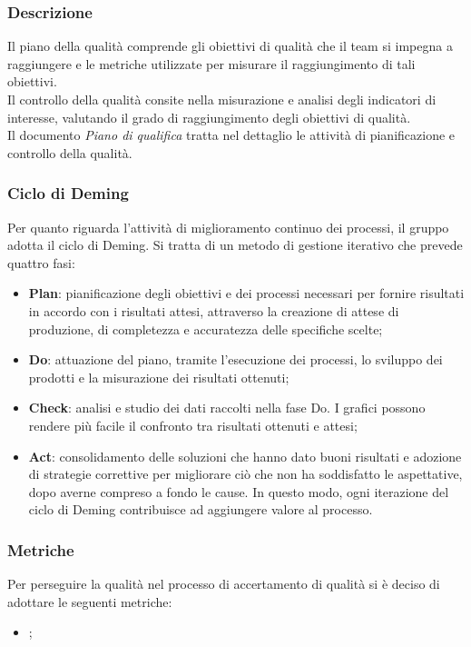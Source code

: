 \subsubsection{Descrizione}
Il piano della qualità comprende gli obiettivi di qualità che il team si
impegna a raggiungere e le metriche utilizzate per misurare il raggiungimento
di tali obiettivi. \\ Il controllo della qualità consite nella misurazione e
analisi degli indicatori di interesse, valutando il grado di raggiungimento
degli obiettivi di qualità. \\ Il documento \textit{Piano di qualifica} tratta
nel dettaglio le attività di pianificazione e controllo della qualità. \\
\subsubsection{Ciclo di Deming}
Per quanto riguarda l'attività di miglioramento continuo dei processi, il
gruppo adotta il ciclo di Deming. Si tratta di un metodo di gestione iterativo
che prevede quattro fasi:
\begin{itemize}
      \item \textbf{Plan}: pianificazione degli obiettivi e dei processi necessari per fornire
            risultati in accordo con i risultati attesi, attraverso la creazione di attese di
            produzione, di completezza e accuratezza delle specifiche scelte;
      \item \textbf{Do}: attuazione del piano, tramite l'esecuzione dei processi,
            lo sviluppo dei prodotti e la misurazione dei risultati ottenuti;
      \item \textbf{Check}: analisi e studio dei dati raccolti nella fase Do.
            I grafici possono rendere più facile il confronto tra risultati ottenuti e attesi;
      \item \textbf{Act}: consolidamento delle soluzioni che hanno dato buoni risultati e
            adozione di strategie correttive per migliorare ciò che non ha soddisfatto le aspettative,
            dopo averne compreso a fondo le cause. In questo modo, ogni iterazione del ciclo di Deming
            contribuisce ad aggiungere valore al processo.
\end{itemize}
\subsubsection{Metriche}
Per perseguire la qualità nel processo di accertamento di qualità si è deciso
di adottare le seguenti metriche:
\begin{itemize}
      \item {};
\end{itemize}
